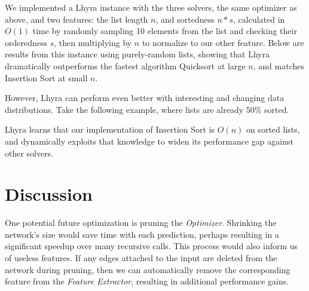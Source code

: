 \documentclass{article}
\begin{document}
We implemented a Lhyra instance with the three solvers, the same optimizer as above, and two features: the list length $n$, and sortedness $n*s$, calculated in $O(1)$ time by randomly sampling 10 elements from the list and checking their orderedness $s$, then multiplying by $n$ to normalize to our other feature.  Below are results from this instance using purely-random lists, showing that Lhyra dramatically outperforms the fastest algorithm Quicksort at large $n$, and matches Insertion Sort at small $n$.

\vspace{0.5cm}
\begin{figure}[!ht]
    \centering
    \begin{floatrow}
      
    \end{floatrow}
\end{figure}

However, Lhyra can perform even better with interesting and changing data distributions.  Take the following example, where lists are already 50\% sorted.

\vspace{0.5cm}
\begin{figure}[!ht]
    \centering
    \begin{floatrow}
      
    \end{floatrow}
\end{figure}

Lhyra learns that our implementation of Insertion Sort is $O(n)$ on sorted lists, and dynamically exploits that knowledge to widen its performance gap against other solvers.

\section{Discussion}

One potential future optimization is pruning the \textit{Optimizer}. Shrinking the network's size would save time with each prediction, perhaps resulting in a significant speedup over many recursive calls. This process would also inform us of useless features. If any edges attached to the input are deleted from the network during pruning, then we can automatically remove the corresponding feature from the \textit{Feature Extractor}, resulting in additional performance gains.
\end{document}
